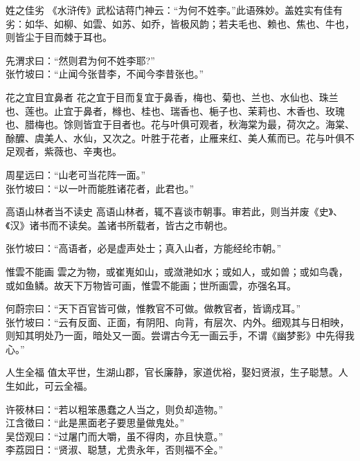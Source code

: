 \begin{yulu}{姓之佳劣}
《水浒传》武松诘蒋门神云：“为何不姓李。”此语殊妙。盖姓实有佳有劣：如华、如柳、如雲、如苏、如乔，皆极风韵；若夫毛也、赖也、焦也、牛也，则皆尘于目而棘于耳也。
\begin{comments}
先渭求曰：“然则君为何不姓李耶?” \\
张竹坡曰：“止闻今张昔李，不闻今李昔张也。”
\end{comments}
\end{yulu}

\begin{yulu}{花之宜目宜鼻者}
花之宜于目而复宜于鼻香，梅也、菊也、兰也、水仙也、珠兰也、莲也。止宜于鼻者，橼也、桂也、瑞香也、梔子也、茉莉也、木香也、玫瑰也、腊梅也。馀则皆宜于目者也。花与叶俱可观者，秋海棠为最，荷次之。海棠、酴醾、虞美人、水仙，又次之。叶胜于花者，止雁来红、美人蕉而已。花与叶俱不足观者，紫薇也、辛夷也。
\begin{comments}
周星远曰：“山老可当花阵一面。” \\
张竹坡曰：“以一叶而能胜诸花者，此君也。”
\end{comments}
\end{yulu}

\begin{yulu}{高语山林者当不读史}
高语山林者，辄不喜谈市朝事。审若此，则当并废《史》、《汉》诸书而不读矣。盖诸书所载者，皆古之市朝也。
\begin{comments}
张竹坡曰：“高语者，必是虚声处士；真入山者，方能经纶市朝。”
\end{comments}
\end{yulu}

\begin{yulu}{惟雲不能画}
雲之为物，或崔嵬如山，或潋滟如水；或如人，或如兽；或如鸟毳，或如鱼鳞。故天下万物皆可画，惟雲不能画；世所画雲，亦强名耳。
\begin{comments}
何蔚宗曰：“天下百官皆可做，惟教官不可做。做教官者，皆谪戍耳。” \\
张竹坡曰：“云有反面、正面，有阴阳、向背，有层次、内外。细观其与日相映，则知其明处乃一面，暗处又一面。尝谓古今无一画云手，不谓《幽梦影》中先得我心。”
\end{comments}
\end{yulu}

\begin{yulu}{人生全福}
值太平世，生湖山郡，官长廉静，家道优裕，娶妇贤淑，生子聪慧。人生如此，可云全福。
\begin{comments}
许筱林曰：“若以粗笨愚蠢之人当之，则负却造物。” \\
江含徵曰：“此是黑面老子要思量做鬼处。” \\
吴岱观曰：“过屠门而大嚼，虽不得肉，亦且快意。” \\
李荔园日：“贤淑、聪慧，尤贵永年，否则福不全。”
\end{comments}
\end{yulu}

